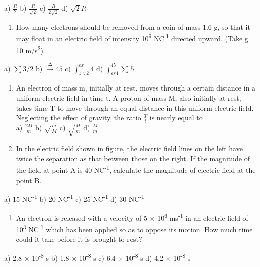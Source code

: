 a) \(\frac{R}{2}\) b) \(\frac{R}{\sqrt{2}}\) c) \(\frac{R}{2\sqrt{2}}\)
d) \(\sqrt{2}R\)

\begin{enumerate}
\def\labelenumi{\arabic{enumi}.}
\setcounter{enumi}{20}
\item
  How many electrons should be removed from a coin of mass 1.6 g, so
  that it may float in an electric field of intensity
  10\textsuperscript{9} NC\textsuperscript{-1} directed upward. (Take g
  = 10 m/s\textsuperscript{2})
\end{enumerate}

a) \(\sum_{}^{}{3/2}\) b) \(\overset{\mathrm{\Delta}}{\rightarrow}45\)
c) \(\int_{1\backslash 2}^{ex}4\) d) \(\int_{as4}^{45}{\sum_{}^{}5}\)

\begin{enumerate}
\def\labelenumi{\arabic{enumi}.}
\setcounter{enumi}{21}
\item
  An electron of mass m, initially at rest, moves through a certain
  distance in a uniform electric field in time t. A proton of mass M,
  also initially at rest, takes time T to move through an equal distance
  in this uniform electric field. Neglecting the effect of gravity, the
  ratio \(\frac{T}{t}\) is nearly equal to\\
  a) \(\frac{2M}{m}\) b) \(\sqrt{\frac{m}{M}}\) c)
  \(\sqrt{\frac{M}{m}}\) d) \(\frac{M}{m}\)
\item
  In the electric field shown in figure, the electric field lines on the
  left have twice the separation as that between those on the right. If
  the magnitude of the field at point A is 40 NC\textsuperscript{-1},
  calculate the magnitude of electric field at the point B.
\end{enumerate}

a) 15 NC\textsuperscript{-1} b) 20 NC\textsuperscript{-1} c) 25
NC\textsuperscript{-1} d) 30 NC\textsuperscript{-1}

\begin{enumerate}
\def\labelenumi{\arabic{enumi}.}
\setcounter{enumi}{23}
\item
  An electron is released with a velocity of 5 × 10\textsuperscript{6}
  ms\textsuperscript{-1} in an electric field of 10\textsuperscript{3}
  NC\textsuperscript{-1} which has been applied so as to oppose its
  motion. How much time could it take before it is brought to rest?
\end{enumerate}

a) 2.8 × 10\textsuperscript{-8} s b) 1.8 × 10\textsuperscript{-8} s c)
6.4 × 10\textsuperscript{-8} s d) 4.2 × 10\textsuperscript{-8} s

